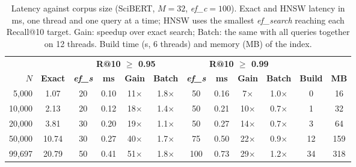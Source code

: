 \begin{table}[tbp]
\caption{Latency against corpus size (SciBERT, $M=32$, \textit{ef\_c}$=100$). Exact and HNSW latency in ms, one thread and one query at a time; HNSW uses the smallest \textit{ef\_search} reaching each Recall@10 target. Gain: speedup over exact search; Batch: the same with all queries together on 12 threads. Build time (s, 6 threads) and memory (MB) of the index.}\label{tab:escalabilidad_scibert}
\centering
\small
\begin{tabular}{|r|c|c|c|c|c|c|c|c|c|c|c|}
\hline
 & & \multicolumn{4}{c|}{\textbf{R@10 $\geq$ 0.95}} & \multicolumn{4}{c|}{\textbf{R@10 $\geq$ 0.99}} & & \\ \cline{3-10}
\textbf{$N$} & \textbf{Exact} & \textbf{\textit{ef\_s}} & \textbf{ms} & \textbf{Gain} & \textbf{Batch} & \textbf{\textit{ef\_s}} & \textbf{ms} & \textbf{Gain} & \textbf{Batch} & \textbf{Build} & \textbf{MB} \\
\hline
5,000 & 1.07 & 20 & 0.10 & 11$\times$ & 1.8$\times$ & 50 & 0.16 & 7$\times$ & 1.0$\times$ & 0 & 16 \\
10,000 & 2.13 & 20 & 0.12 & 18$\times$ & 1.4$\times$ & 50 & 0.21 & 10$\times$ & 0.7$\times$ & 1 & 32 \\
20,000 & 3.81 & 30 & 0.20 & 19$\times$ & 1.1$\times$ & 50 & 0.27 & 14$\times$ & 0.7$\times$ & 3 & 64 \\
50,000 & 10.74 & 30 & 0.27 & 40$\times$ & 1.7$\times$ & 75 & 0.50 & 22$\times$ & 0.9$\times$ & 12 & 159 \\
99,697 & 20.79 & 50 & 0.41 & 51$\times$ & 1.8$\times$ & 100 & 0.73 & 29$\times$ & 1.2$\times$ & 34 & 318 \\
\hline
\end{tabular}
\end{table}

